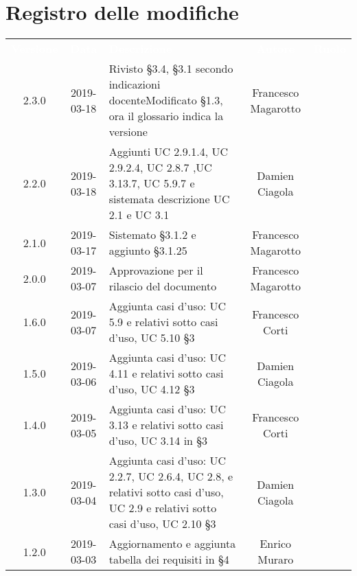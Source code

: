 \section*{Registro delle modifiche}
{
	\renewcommand{\arraystretch}{1.5}
	\centering
	\begin{longtable}{ c c C{6cm} c c }
		\textcolor{white}{\textbf{Versione}} & \textcolor{white}{\textbf{Data}} & \textcolor{white}{\textbf{Descrizione}} & \textcolor{white}{\textbf{Autore}} & \textcolor{white}{\textbf{Ruolo}}\\
		2.3.0 &
		2019-03-18 &
		Rivisto §3.4, §3.1 secondo indicazioni docente\newline Modificato §1.3, ora il glossario indica la versione   &
		Francesco Magarotto &
		\reda{} \\ 
		
		2.2.0 &	
		2019-03-18 &	
		Aggiunti UC 2.9.1.4, UC 2.9.2.4, UC 2.8.7 ,UC 3.13.7, UC 5.9.7 e sistemata descrizione UC 2.1 e UC 3.1 &
		Damien Ciagola &
		\reda{} \\ 
		
		
		2.1.0 &
		2019-03-17 &
		Sistemato §3.1.2 e aggiunto §3.1.25 &
		Francesco Magarotto &
		\reda{} \\ 
		
		2.0.0 &
		2019-03-07 &
		Approvazione per il rilascio del documento &
		Francesco Magarotto &
		\Res{} \\
		
		1.6.0 &
		2019-03-07 &
		Aggiunta casi d'uso: UC 5.9 e relativi sotto casi d'uso, UC 5.10 §3 &
		Francesco Corti&
		\reda{} \\
		
		1.5.0 &
		2019-03-06 &
		Aggiunta casi d'uso: UC 4.11 e relativi sotto casi d'uso, UC 4.12 §3 &
		Damien Ciagola&
		\reda{} \\
		
		1.4.0 &
		2019-03-05 &
		Aggiunta casi d'uso: UC 3.13 e relativi sotto casi d'uso, UC 3.14 in §3 &
		Francesco Corti&
		\reda{} \\

		1.3.0 &
		2019-03-04 &
		Aggiunta casi d'uso: UC 2.2.7, UC 2.6.4, UC 2.8, e relativi sotto casi d'uso, UC 2.9 e relativi sotto casi d'uso, UC 2.10  §3 &
		Damien Ciagola&
		\reda{} \\
		
		
		1.2.0 &
		2019-03-03 &
		Aggiornamento e aggiunta tabella dei requisiti in §4 &
		Enrico Muraro&
		\reda{} \\
		

\end{longtable}}
